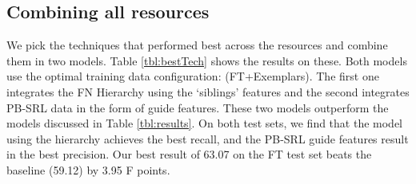 \documentclass[11pt,a4paper]{article}
\newcommand{\ensuretext}[1]{#1}
\newcommand{\mkmarker}{\ensuretext{\textcolor{mdgreen}{\ensuremath{^{\textsc{M}}_{\textsc{K}}}}}}
\newcommand{\arkcomment}[3]{\ensuretext{\textcolor{#3}{[#1 #2]}}}
\newcommand{\mk}[1]{\arkcomment{\mkmarker}{#1}{mdgreen}}
\begin{document}
\subsection{Combining all resources}

We pick the techniques that performed best across the resources and combine them in two models. Table \ref{tbl:bestTech} shows the results on these.
Both models use the optimal training data configuration: (FT+Exemplars). The first one integrates the FN Hierarchy using the `siblings' features
and the second integrates PB-SRL data in the form of guide features. These two models outperform the models discussed in Table \ref{tbl:results}.
On both test sets, we find that the model using the hierarchy achieves the best recall, and the PB-SRL guide features result in the 
best precision. %
Our best result of 63.07 on the FT test set beats the baseline (59.12) by 3.95 F points.
\end{document}
